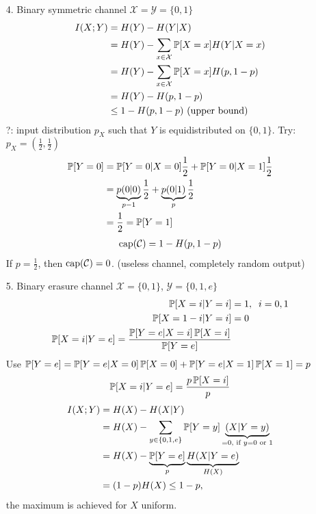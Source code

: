 \documentclass[mfit.tex]{subfiles}
\begin{document}
\begin{exs}
  \begin{enumerate}
    \item[4.] Binary symmetric channel $\mathcal{X} = \mathcal{Y} = \{0,1\}$
    \begin{align*}
      I(X;Y) &= H(Y) - H(Y|X) \\
      &= H(Y) - \sum_{x \in \mathcal{X}} \operatorname{\mathbb{P}}[X=x] H(Y|X=x) \\
      &= H(Y) - \sum_{x \in \mathcal{X}} \operatorname{\mathbb{P}}[X=x] H(p,1-p) \\
      &= H(Y) - H(p,1-p) \\
      &\leq 1 - H(p,1-p) \text{ (upper bound)}
    \end{align*}
    ?: input distribution $p_X$ such that $Y$ is equidistributed on $\{0,1\}$.
    Try: $p_X = \left( \frac{1}{2},\frac{1}{2}\right)$
    \begin{align*}
      \operatorname{\mathbb{P}}[Y=0] &= \operatorname{\mathbb{P}}[Y=0|X=0] \frac{1}{2} + \operatorname{\mathbb{P}}[Y=0|X=1] \frac{1}{2} \\
      &= \underbrace{p(0|0)}_{p-1} \frac{1}{2} + \underbrace{p(0|1)}_{p} \frac{1}{2} \\
      &= \frac{1}{2} = \operatorname{\mathbb{P}}[Y = 1]
    \end{align*}
    \begin{align*}
      \operatorname{cap}(\mathcal{C}) = 1 - H(p,1-p)
    \end{align*}
    If $p = \frac{1}{2}$, then $\operatorname{cap}(\mathcal{C}) = 0$. (useless channel, completely random output)
    \item[5.] Binary erasure channel $\mathcal{X} = \{0,1\}$, $\mathcal{Y} = \{0,1,e\}$
    \begin{align*}
      \operatorname{\mathbb{P}}[X=i|Y=i] &= 1, \;\; i=0,1 \\
      \operatorname{\mathbb{P}}[X=1-i|Y=i] &= 0 \\
      \operatorname{\mathbb{P}}[X=i|Y=e] = \frac{\operatorname{\mathbb{P}}[Y=e|X=i] \operatorname{\mathbb{P}}[X=i]}{\operatorname{\mathbb{P}}[Y=e]}
    \end{align*}
    Use $\operatorname{\mathbb{P}}[Y=e] = \operatorname{\mathbb{P}}[Y=e|X=0] \operatorname{\mathbb{P}}[X=0] + \operatorname{\mathbb{P}}[Y=e|X=1] \operatorname{\mathbb{P}}[X=1] = p$
    \begin{align*}
      \operatorname{\mathbb{P}}[X=i|Y=e] = \frac{p \operatorname{\mathbb{P}}[X=i]}{p}
    \end{align*}
    \begin{align*}
      I(X;Y) &= H(X) - H(X|Y) \\
      &= H(X) - \sum_{y \in \{0,1,e\}} \operatorname{\mathbb{P}}[Y=y] \underbrace{(X|Y=y)}_{=0 \text{, if } y=0 \text{ or }1} \\
      &= H(X) - \underbrace{\operatorname{\mathbb{P}}[Y=e]}_{p} \underbrace{H(X|Y=e)}_{H(X)} \\
      &= (1-p)H(X) \leq 1-p,
    \end{align*}
    the maximum is achieved for $X$ uniform.
  \end{enumerate}
\end{exs}
\end{document}
